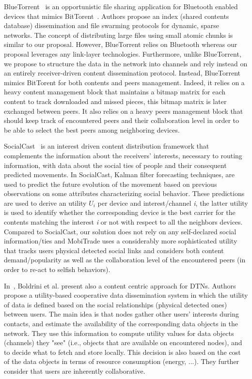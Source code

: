 BlueTorrent~\cite{BlueTorrent} is an opportunistic file sharing application for Bluetooth enabled devices that mimics BitTorent~\cite{RefBT}. Authors propose an index (shared contents database) dissemination and file swarming protocols for dynamic, sparse networks. The concept of distributing large files using small atomic chunks is similar to our proposal. However, BlueTorrent relies on Bluetooth whereas our proposal leverages any link-layer technologies. Furthermore, unlike BlueTorrent, we propose to structure the data in the network into channels and rely instead on an entirely receiver-driven content dissemination protocol. Instead, BlueTorrent mimics BitTorent for both contents and peers management. Indeed, it relies on a heavy content management block that maintains a bitmap matrix for each content to track downloaded and missed pieces, this bitmap matrix is later exchanged between peers. It also relies on a heavy peers management block that should keep track of encountered peers and their collaboration level in order to be able to select the best peers among neighboring devices.

SocialCast~\cite{SocialCast2, SocialCast} is an interest driven content distribution framework that complements the information about the receivers' interests, necessary to routing information, with data about the social ties of people and their consequent predicted movements. In SocialCast, Kalman filter forecasting techniques, are used to predict the future evolution of the movement based on previous observations on some attributes characterizing social behavior. These predictions are used to derive an utility $U_i$ per device and interest/channel \emph{i}, the latter utility is used to identify whether the corresponding device is the best carrier for the contents matching
the interest \emph{i} or not with respect to all the neighbors devices. Compared to SocialCast, our solution does not rely on any self-declared social information/ties and MobiTrade uses a considerably more sophisticated utility that tracks users physical detected social links and considers both content demand/popularity as well as the collaboration level of the encountered peers (in order to re-act to selfish behaviors).

In~\cite{Boldrini:2008:MDD}, Boldrini et al. present also a content centric approach for DTNs. Authors propose a utility-based cooperative data dissemination system in which the utility of data is defined based on the social
relationships (physical detected ones) between users.  The main idea is that nodes gather other users' interests during contacts, and estimate the availability of the corresponding data objects in the network. They use this information to compute utility values for data objects (channels) they "see" (i.e., objects that are available on encountered nodes), and to decide what to fetch and store locally. This decision is also based on the cost of the data objects in terms of resource consumption (energy, ...). They further consider that users are inherently collaborative.

